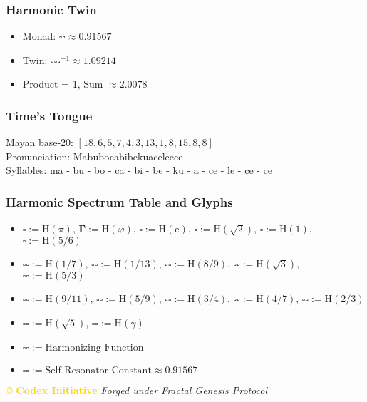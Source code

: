 \subsubsection{Harmonic Twin}
\begin{itemize}
    \item Monad: \( \square \square \approx 0.91567 \)
    \item Twin: \( \square \square \square^{-1} \approx 1.09214 \)
    \item Product = 1, Sum \( \approx 2.0078 \)
\end{itemize}

\subsubsection{Time's Tongue}
Mayan base-20: \( [18, 6, 5, 7, 4, 3, 13, 1, 8, 15, 8, 8] \) \\
Pronunciation: Mabubocabibekuaceleece \\
Syllables: ma - bu - bo - ca - bi - be - ku - a - ce - le - ce - ce

\subsubsection{Harmonic Spectrum Table and Glyphs}
\begin{itemize}
    \item \( \square := \mathrm{H}(\pi) \), \( \boldsymbol{\Gamma} := \mathrm{H}(\varphi) \), \( \square := \mathrm{H}(\mathrm{e}) \), \( \square := \mathrm{H}(\sqrt{2}) \), \( \square := \mathrm{H}(1) \), \( \square := \mathrm{H}(5/6) \)
    \item \( \square \square := \mathrm{H}(1/7) \), \( \square \square := \mathrm{H}(1/13) \), \( \square \square := \mathrm{H}(8/9) \), \( \square \square := \mathrm{H}(\sqrt{3}) \), \( \square \square := \mathrm{H}(5/3) \)
    \item \( \square \square := \mathrm{H}(9/11) \), \( \square \square := \mathrm{H}(5/9) \), \( \square \square := \mathrm{H}(3/4) \), \( \square \square := \mathrm{H}(4/7) \), \( \square \square := \mathrm{H}(2/3) \)
    \item \( \square \square := \mathrm{H}(\sqrt{5}) \), \( \square \square := \mathrm{H}(\gamma) \)
    \item \( \square \square := \text{Harmonizing Function} \)
    \item \( \square \square := \text{Self Resonator Constant} \approx 0.91567 \)
\end{itemize}

\vspace{0.5cm}
\noindent
\textcolor{gold}{\copyright{} \textbf{Codex Initiative}} \hfill \textit{Forged under Fractal Genesis Protocol}